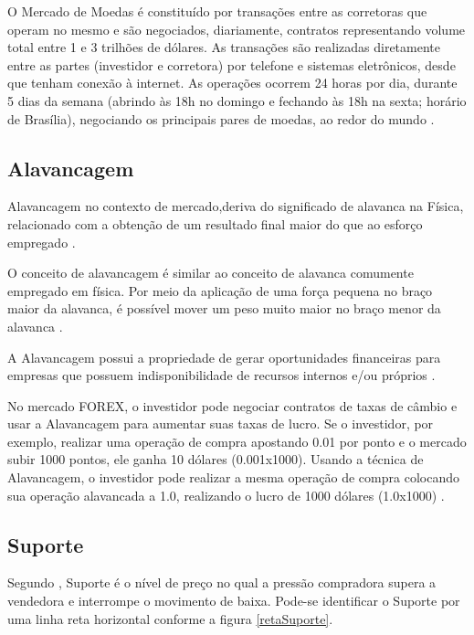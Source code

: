 O Mercado de Moedas é constituído por transações entre as corretoras que operam no mesmo e são negociados, diariamente, contratos representando volume total entre 1 e 3 trilhões de dólares. As transações são realizadas diretamente entre as partes (investidor e corretora) por telefone e sistemas eletrônicos, desde que tenham conexão à internet. As operações ocorrem 24 horas por dia, durante 5 dias da semana (abrindo às 18h no domingo e fechando às 18h na sexta; horário de Brasília), negociando os principais pares de moedas, ao redor do mundo \cite[p.~4]{cvm2009}.

\subsection{Alavancagem}
Alavancagem no contexto de mercado,deriva do significado de alavanca na Física, relacionado com a obtenção de um resultado final maior do que ao esforço empregado \cite[p.~3]{dantas2006}.

\begin{citacao}
O conceito de alavancagem é similar ao conceito de alavanca comumente empregado em física. Por meio da aplicação de uma força pequena no braço maior da alavanca, é possível mover um peso muito maior no braço menor da alavanca \cite[p.~232]{bruni2011}.
\end{citacao}

A Alavancagem possui a propriedade de gerar oportunidades financeiras para empresas que possuem indisponibilidade de recursos internos e/ou próprios \cite[p~13]{albuquerque2013}.

No mercado FOREX, o investidor pode negociar contratos de taxas de câmbio e usar a Alavancagem para aumentar suas taxas de lucro. Se o investidor, por exemplo, realizar uma operação de compra apostando 0.01 por ponto e o mercado subir 1000 pontos, ele ganha 10 dólares (0.001x1000). Usando a técnica de Alavancagem, o investidor pode realizar a mesma operação de compra colocando sua operação alavancada a 1.0, realizando o lucro de 1000 dólares (1.0x1000) \cite{easyforex2014}.

\subsection{Suporte}

Segundo ,  Suporte é o nível de preço no qual a pressão compradora supera a vendedora e interrompe o movimento de baixa. Pode-se identificar o Suporte por uma linha reta horizontal conforme a figura \ref{retaSuporte}.

